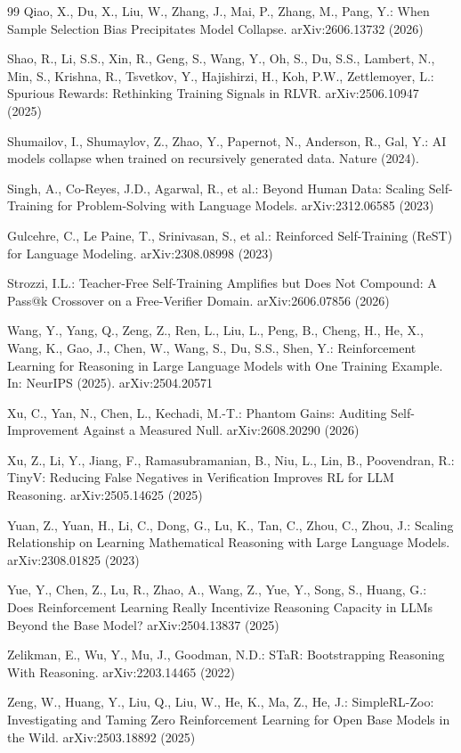 \documentclass[runningheads]{llncs}
\begin{document}
\begin{thebibliography}{99}
Qiao, X., Du, X., Liu, W., Zhang, J., Mai, P., Zhang, M., Pang, Y.:
When Sample Selection Bias Precipitates Model Collapse. arXiv:2606.13732
(2026)

Shao, R., Li, S.S., Xin, R., Geng, S., Wang, Y., Oh, S., Du, S.S., Lambert,
N., Min, S., Krishna, R., Tsvetkov, Y., Hajishirzi, H., Koh, P.W.,
Zettlemoyer, L.: Spurious Rewards: Rethinking Training Signals in RLVR.
arXiv:2506.10947 (2025)

Shumailov, I., Shumaylov, Z., Zhao, Y., Papernot, N., Anderson, R., Gal,
Y.: AI models collapse when trained on recursively generated data. Nature
(2024). 

Singh, A., Co-Reyes, J.D., Agarwal, R., et al.: Beyond Human Data: Scaling
Self-Training for Problem-Solving with Language Models. arXiv:2312.06585
(2023)

Gulcehre, C., Le Paine, T., Srinivasan, S., et al.: Reinforced
Self-Training (ReST) for Language Modeling. arXiv:2308.08998 (2023)

Strozzi, I.L.: Teacher-Free Self-Training Amplifies but Does Not Compound:
A Pass@k Crossover on a Free-Verifier Domain. arXiv:2606.07856 (2026)

Wang, Y., Yang, Q., Zeng, Z., Ren, L., Liu, L., Peng, B., Cheng, H., He, X.,
Wang, K., Gao, J., Chen, W., Wang, S., Du, S.S., Shen, Y.: Reinforcement
Learning for Reasoning in Large Language Models with One Training Example.
In: NeurIPS (2025). arXiv:2504.20571

Xu, C., Yan, N., Chen, L., Kechadi, M.-T.: Phantom Gains: Auditing
Self-Improvement Against a Measured Null. arXiv:2608.20290 (2026)

Xu, Z., Li, Y., Jiang, F., Ramasubramanian, B., Niu, L., Lin, B.,
Poovendran, R.: TinyV: Reducing False Negatives in Verification Improves RL
for LLM Reasoning. arXiv:2505.14625 (2025)

Yuan, Z., Yuan, H., Li, C., Dong, G., Lu, K., Tan, C., Zhou, C., Zhou, J.:
Scaling Relationship on Learning Mathematical Reasoning with Large Language
Models. arXiv:2308.01825 (2023)

Yue, Y., Chen, Z., Lu, R., Zhao, A., Wang, Z., Yue, Y., Song, S., Huang,
G.: Does Reinforcement Learning Really Incentivize Reasoning Capacity in
LLMs Beyond the Base Model? arXiv:2504.13837 (2025)

Zelikman, E., Wu, Y., Mu, J., Goodman, N.D.: STaR: Bootstrapping Reasoning
With Reasoning. arXiv:2203.14465 (2022)

Zeng, W., Huang, Y., Liu, Q., Liu, W., He, K., Ma, Z., He, J.: SimpleRL-Zoo:
Investigating and Taming Zero Reinforcement Learning for Open Base Models in
the Wild. arXiv:2503.18892 (2025)

\end{thebibliography}
\end{document}
